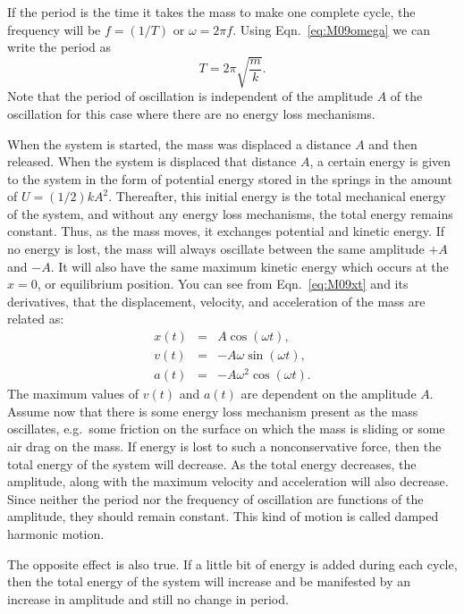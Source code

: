 If the period is the time it takes the mass to make one complete cycle, the frequency will be $f = (1/T)$ or $\omega = 2\pi f$.  Using Eqn.~\ref{eq:M09omega} we can write the period as
\begin{equation}
  \label{eq:M09period}
  T = 2 \pi \sqrt{\frac{m}{k}}.
\end{equation}
Note that the period of oscillation is independent of the amplitude $A$ of the oscillation for this case where there are no energy loss mechanisms.

When the system is started, the mass was displaced a distance $A$ and then released.  When the system is displaced that distance $A$, a certain energy is given to the system in the form of potential energy stored in the springs in the amount of $U=(1/2) k A^{2}$.  Thereafter, this initial energy is the total mechanical energy of the system, and without any energy loss mechanisms, the total energy remains constant.  Thus, as the mass moves, it exchanges potential and kinetic energy.  If no energy is lost, the mass will always oscillate between the same amplitude $+A$ and $-A$.  It will also have the same maximum kinetic energy which occurs at the $x = 0$, or equilibrium position.  You can see from Eqn.~\ref{eq:M09xt} and its derivatives, that the displacement, velocity, and acceleration of the mass are related as:
\begin{eqnarray*}
  x(t) &=&  A          \cos(\omega t),\\
  v(t) &=& -A \omega   \sin(\omega t),\\
  a(t) &=& -A \omega^2 \cos(\omega t).
\end{eqnarray*}
The maximum values of $v(t)$ and $a(t)$ are dependent on the amplitude $A$.  Assume now that there is some energy loss mechanism present as the mass oscillates, e.g.\ some friction on the surface on which the mass is sliding or some air drag on the mass.  If energy is lost to such a nonconservative force, then the total energy of the system will decrease.  As the total energy decreases, the amplitude, along with the maximum velocity and acceleration will also decrease.  Since neither the period nor the frequency of oscillation are functions of the amplitude, they should remain constant.  This kind of motion is called damped harmonic motion.

The opposite effect is also true.  If a little bit of energy is added during each cycle, then the total energy of the system will increase and be manifested by an increase in amplitude and still no change in period.

